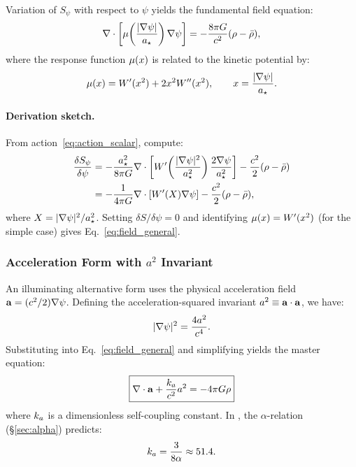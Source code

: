 Variation of $S_\psi$ with respect to $\psi$ yields the fundamental 
field equation:
\begin{equation}
\nabla \cdot \left[\mu\!\left(\frac{|\nabla\psi|}{a_\star}\right)
\nabla\psi\right] = -\frac{8\pi G}{c^2}(\rho - \bar{\rho}),
\label{eq:field_general}
\end{equation}
where the response function $\mu(x)$ is related to the kinetic 
potential by:
\begin{equation}
\mu(x) = W'(x^2) + 2x^2W''(x^2), \qquad x = \frac{|\nabla\psi|}{a_\star}.
\end{equation}

\paragraph{Derivation sketch.}
From action~\eqref{eq:action_scalar}, compute:
\begin{align}
\frac{\delta S_\psi}{\delta\psi} &= -\frac{a_\star^2}{8\pi G}\nabla\cdot
\left[W'\!\left(\frac{|\nabla\psi|^2}{a_\star^2}\right)
\frac{2\nabla\psi}{a_\star^2}\right] - \frac{c^2}{2}(\rho - \bar{\rho}) \nonumber\\
&= -\frac{1}{4\pi G}\nabla\cdot\left[W'(X)\nabla\psi\right] 
- \frac{c^2}{2}(\rho - \bar{\rho}),
\end{align}
where $X = |\nabla\psi|^2/a_\star^2$. Setting $\delta S/\delta\psi = 0$ and 
identifying $\mu(x) = W'(x^2)$ (for the simple case) gives 
Eq.~\eqref{eq:field_general}.

\subsubsection{Acceleration Form with $a^2$ Invariant}

An illuminating alternative form uses the physical acceleration field 
$\mathbf{a} = (c^2/2)\nabla\psi$. Defining the acceleration-squared invariant 
$a^2 \equiv \mathbf{a} \cdot \mathbf{a}$, we have:
\begin{equation}
|\nabla\psi|^2 = \frac{4a^2}{c^4}.
\end{equation}
Substituting into Eq.~\eqref{eq:field_general} and simplifying yields 
the master equation:
\begin{equation}
\boxed{
\nabla \cdot \mathbf{a} + \frac{k_a}{c^2}a^2 = -4\pi G\rho
}
\label{eq:master_acceleration}
\end{equation}
where $k_a$ is a dimensionless self-coupling constant. 
In \DFD, the $\alpha$-relation (\S\ref{sec:alpha}) predicts:
\begin{equation}
k_a = \frac{3}{8\alpha} \approx 51.4.
\end{equation}


